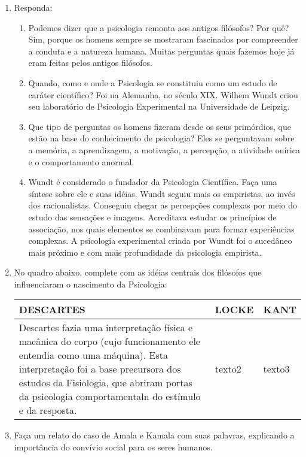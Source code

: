 \documentclass[a4paper, 12pt]{article}
\begin{document}
\begin{enumerate}
  
\item Responda: 
  \begin{enumerate}
  \item Podemos dizer que a psicologia remonta aos antigos filósofos? Por quê? \newline \newline
    Sim, porque os homens sempre se mostraram fascinados por compreender a conduta e a natureza humana. Muitas perguntas quais fazemos hoje já eram feitas pelos antigos filósofos. \newline
  \item Quando, como e onde a Psicologia se constituiu como um estudo de caráter científico? \newline \newline
  Foi na Alemanha, no século XIX. Wilhem Wundt criou seu laboratório de Psicologia Experimental na Universidade de Leipzig. \newline 
  \item Que tipo de perguntas os homens fizeram desde os seus primórdios, que estão na base do conhecimento de psicologia? \newline \newline
  Eles se perguntavam sobre a memória, a aprendizagem, a motivação, a percepção, a atividade onírica e o comportamento anormal. \newline
  \item Wundt é considerado o fundador da Psicologia Científica. Faça uma síntese sobre ele e suas idéias. \newline \newline
    Wundt seguiu mais os empiristas, ao invés dos racionalistas. Conseguiu chegar as percepções complexas por meio do estudo das sensações e imagens. Acreditava estudar os princípios de associação, nos quais elementos se combinavam para formar experiências complexas. A psicologia experimental criada por Wundt foi o sucedâneo mais próximo e com mais profundidade da psicologia empirista.
    \newline
  \end{enumerate}

\item No quadro abaixo, complete com as idéias centrais dos filósofos que influenciaram o nascimento da Psicologia: \newline \newline
  \centering
  \begin{tabular}{| m{4cm} | m{4cm} | m{4cm} |}
    \hline
    \textbf{DESCARTES} & \textbf{LOCKE} & \textbf{KANT} \\ \hline
    Descartes fazia uma interpretação física e macânica do corpo (cujo funcionamento ele entendia como uma máquina). Esta interpretação foi a base precursora dos estudos da Fisiologia, que abriram portas  da psicologia comportamentaln do estímulo e da resposta. & texto2 & texto3 \\ \hline
  \end{tabular} \newline
  
\item Faça um relato do caso de Amala e Kamala com suas palavras, explicando a importância do convívio social para os seres humanos.
\end{enumerate}
\end{document}
